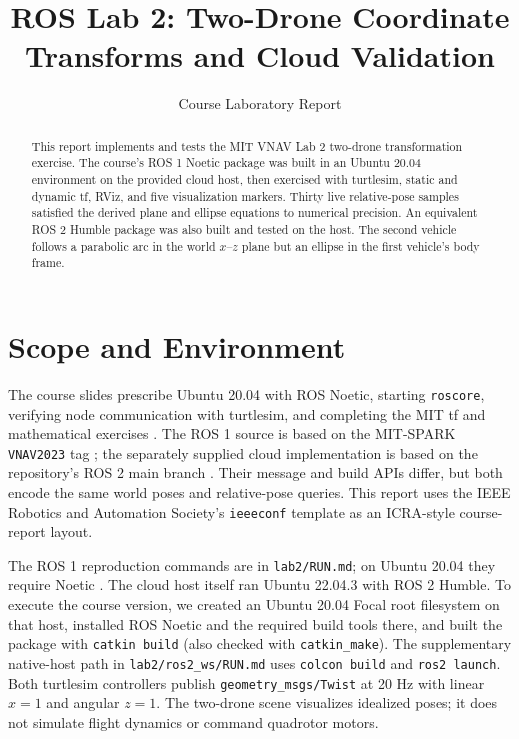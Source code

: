 \documentclass[letterpaper,10pt,conference]{ieeeconf}
\title{ROS Lab 2: Two-Drone Coordinate Transforms and Cloud Validation}
\author{Course Laboratory Report}
\begin{document}
\maketitle

\begin{abstract}
This report implements and tests the MIT VNAV Lab 2 two-drone transformation exercise. The course's ROS 1 Noetic package was built in an Ubuntu 20.04 environment on the provided cloud host, then exercised with turtlesim, static and dynamic tf, RViz, and five visualization markers. Thirty live relative-pose samples satisfied the derived plane and ellipse equations to numerical precision. An equivalent ROS 2 Humble package was also built and tested on the host. The second vehicle follows a parabolic arc in the world $x$--$z$ plane but an ellipse in the first vehicle's body frame.
\end{abstract}

\section{Scope and Environment}
The course slides prescribe Ubuntu 20.04 with ROS Noetic, starting \texttt{roscore}, verifying node communication with turtlesim, and completing the MIT tf and mathematical exercises \cite{course,mit}. The ROS 1 source is based on the MIT-SPARK \texttt{VNAV2023} tag \cite{code}; the separately supplied cloud implementation is based on the repository's ROS 2 main branch \cite{code2}. Their message and build APIs differ, but both encode the same world poses and relative-pose queries. This report uses the IEEE Robotics and Automation Society's \texttt{ieeeconf} template \cite{template} as an ICRA-style course-report layout.

The ROS 1 reproduction commands are in \texttt{lab2/RUN.md}; on Ubuntu 20.04 they require Noetic \cite{noetic}. The cloud host itself ran Ubuntu 22.04.3 with ROS 2 Humble. To execute the course version, we created an Ubuntu 20.04 Focal root filesystem on that host, installed ROS Noetic and the required build tools there, and built the package with \texttt{catkin build} (also checked with \texttt{catkin\_make}). The supplementary native-host path in \texttt{lab2/ros2\_ws/RUN.md} uses \texttt{colcon build} and \texttt{ros2 launch}. Both turtlesim controllers publish \texttt{geometry\_msgs/Twist} at 20 Hz with linear $x=1$ and angular $z=1$. The two-drone scene visualizes idealized poses; it does not simulate flight dynamics or command quadrotor motors.
\end{document}
